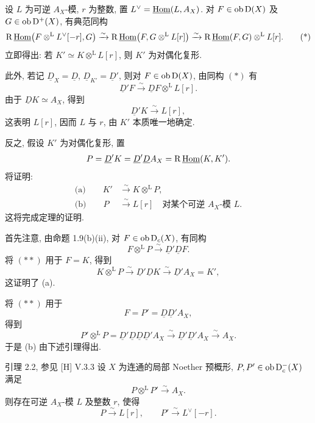 \begin{prooftext}
设 $L$ 为可逆 $A_X$-模, $r$ 为整数, 置 $L^\vee=\underline{\operatorname{Hom}}(L,A_X)$. 对 $F\in\operatorname{ob}\mathrm{D}(X)$ 及 $G\in\operatorname{ob}\mathrm{D}^+(X)$, 有典范同构
\begin{equation}
\mathrm R\,\underline{\operatorname{Hom}}\bigl(F\otimes^{\mathrm L}L^\vee[-r],G\bigr)
   \xrightarrow{\sim}
\mathrm R\,\underline{\operatorname{Hom}}\bigl(F,G\otimes^{\mathrm L}L[r]\bigr)
   \xrightarrow{\sim}
\mathrm R\,\underline{\operatorname{Hom}}(F,G)\otimes^{\mathrm L}L[r]. \tag{*}
\end{equation}
立即得出: 若 $K'\simeq K\otimes^{\mathrm L}L[r]$, 则 $K'$ 为对偶化复形.

此外, 若记 $\underline D_X=\underline D$, $\underline D_{K'}=\underline D'$, 则对 $F\in\operatorname{ob}\mathrm{D}(X)$, 由同构 $(*)$ 有
\[
   \underline D'F\xrightarrow{\sim}\underline DF\otimes^{\mathrm L}L[r].
\]
由于 $\underline DK\simeq A_X$, 得到
\[
   \underline D'K\xrightarrow{\sim}L[r],
\]
这表明 $L[r]$, 因而 $L$ 与 $r$, 由 $K'$ 本质唯一地确定.

反之, 假设 $K'$ 为对偶化复形, 置
\[
   P=\underline D'K=\underline D'\underline DA_X=\mathrm R\,\underline{\operatorname{Hom}}(K,K').
\]
将证明:
\begin{align*}
\text{(a)}\qquad K'&\xrightarrow{\sim}K\otimes^{\mathrm L}P,\\
\text{(b)}\qquad P&\xrightarrow{\sim}L[r]\quad\text{对某个可逆 }A_X\text{-模 }L.
\end{align*}
这将完成定理的证明.

首先注意, 由命题 1.9(b)(ii), 对 $F\in\operatorname{ob}\mathrm{D}_c(X)$, 有同构
\begin{equation}
F\otimes^{\mathrm L}P\xrightarrow{\sim}\underline D'\underline DF. \tag{**}
\end{equation}
将 $(**)$ 用于 $F=K$, 得到
\[
   K\otimes^{\mathrm L}P\xrightarrow{\sim}\underline D'\underline DK\xrightarrow{\sim}\underline D'A_X=K',
\]
这证明了 (a).

将 $(**)$ 用于
\[
   F=P'=\underline D\underline D'A_X,
\]
得到
\[
   P'\otimes^{\mathrm L}P
      =\underline D'\underline D\underline D\underline D'A_X
      \xrightarrow{\sim}\underline D'\underline D'A_X
      \xrightarrow{\sim}A_X.
\]
于是 (b) 由下述引理得出. \qedtext
\end{prooftext}

\begin{statement}{引理 2.2, 参见 [H] V.3.3}
设 $X$ 为连通的局部 Noether 预概形, $P,P'\in\operatorname{ob}\mathrm{D}_c^-(X)$ 满足
\[
   P\otimes^{\mathrm L}P'\xrightarrow{\sim}A_X.
\]
则存在可逆 $A_X$-模 $L$ 及整数 $r$, 使得
\[
   P\xrightarrow{\sim}L[r],\qquad P'\xrightarrow{\sim}L^\vee[-r].
\]
\end{statement}

